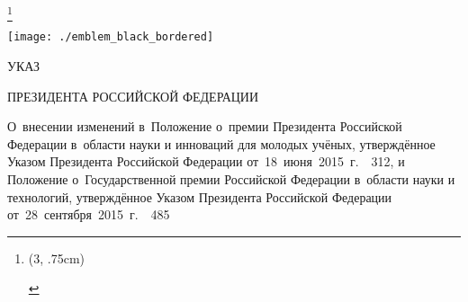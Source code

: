\documentclass[14pt, a4paper]{extarticle}
\begin{document}
\let\thefootnote\relax\footnote{
	\centering\hspace*{-1cm}
	\begin{pspicture}(3, .75cm)
	\end{pspicture}
}

\begin{center}
	\thispagestyle{empty}

	\setBold[.3]
	
	\vspace*{-1cm}
	\texttt{[image: ./emblem\_black\_bordered]} 
	
	\huge УКАЗ \bigskip
	
	\large ПРЕЗИДЕНТА РОССИЙСКОЙ ФЕДЕРАЦИИ \bigskip\bigskip\bigskip
	
	\begin{minipage}{.9\textwidth}
		\setBold[.4]
		\centering\normalsize
		О~внесении изменений в~Положение о~премии Президента Российской Федерации в~области науки и инноваций для молодых учёных, утверждённое Указом Президента Российской Федерации от~18~июня~2015~г.~\textnumero~312, и Положение о~Государственной премии Российской Федерации в~области науки и технологий, утверждённое Указом Президента Российской Федерации от~28~сентября~2015~г.~\textnumero~485
	\end{minipage}

	\unsetBold
\end{center}

\bigskip
\end{document}
